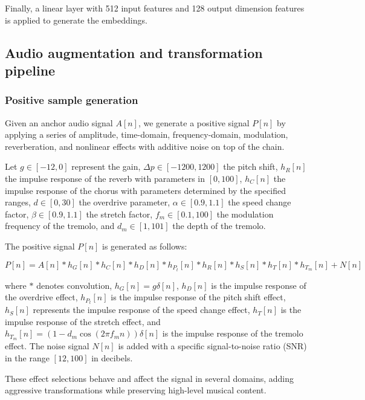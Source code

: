 

Finally, a linear layer with 512 input features and 128 output dimension features is applied to generate the embeddings.



\subsection{Audio augmentation and transformation pipeline}

\subsubsection{Positive sample generation}
Given an anchor audio signal $A[n]$, we generate a positive signal $P[n]$ by applying a series of amplitude, time-domain, frequency-domain, modulation, reverberation, and nonlinear effects with additive noise on top of the chain. 

Let $g \in [-12, 0]$ represent the gain, $\Delta p \in [-1200, 1200]$ the pitch shift, $h_R[n]$ the impulse response of the reverb with parameters in $[0, 100]$, $h_C[n]$ the impulse response of the chorus with parameters determined by the specified ranges, $d \in [0, 30]$ the overdrive parameter, $\alpha \in [0.9, 1.1]$ the speed change factor, $\beta \in [0.9, 1.1]$ the stretch factor, $f_m \in [0.1, 100]$ the modulation frequency of the tremolo, and $d_m \in [1, 101]$ the depth of the tremolo. 

The positive signal $P[n]$ is generated as follows:

\begin{equation}\label{eq:positive_signal}
P[n] = A[n] \ast h_{G}[n] \ast h_{C}[n] \ast h_{D}[n] \ast h_{P_t}[n] \ast h_{R}[n] \ast h_{S}[n] \ast h_{T}[n] \ast h_{T_m}[n] + N[n]
\end{equation}

where $\ast$ denotes convolution, $h_{G}[n] = g \delta[n]$, $h_{D}[n]$ is the impulse response of the overdrive effect, $h_{P_t}[n]$ is the impulse response of the pitch shift effect, $h_{S}[n]$ represents the impulse response of the speed change effect, $h_{T}[n]$ is the impulse response of the stretch effect, and $h_{T_m}[n] = (1 - d_m \cos(2 \pi f_m n))\delta[n]$ is the impulse response of the tremolo effect. The noise signal $N[n]$ is added with a specific signal-to-noise ratio (SNR) in the range $[12, 100]$ in decibels.

These effect selections behave and affect the signal in several domains, adding aggressive transformations while preserving high-level musical content.

